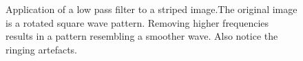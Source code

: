 \documentclass[11pt,a4paper]{article}
\begin{document}
\begin{figure}
\quad
{}


\caption{Application of a low pass filter to a striped image.The original image is a rotated square wave pattern. Removing higher frequencies results in a pattern resembling a smoother wave. Also notice the ringing artefacts.}%
\label{fig:a1e}%
\end{figure}
\end{document}
